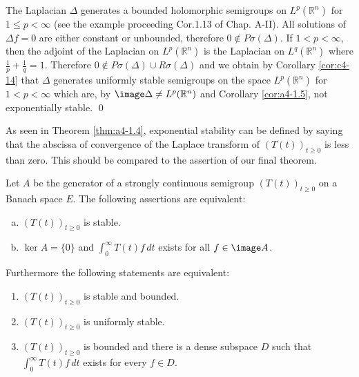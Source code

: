 \begin{example}\label{ex:a4-15}
The Laplacian $\Delta$ generates a bounded holomorphic semigroups on $L^{p}(\mathbb{R}^{n})$ for $1 \leq p < \infty$ (see the example proceeding
Cor.1.13 of Chap. A-II). 
All solutions of $\Delta f = 0$ are either constant
or unbounded, therefore $0 \not\in P\sigma(\Delta)$. 
If $1 < p < \infty$, then the adjoint
of the Laplacian on $L^{p}(\mathbb{R}^{n})$ is the Laplacian on $L^{q}(\mathbb{R}^{n})$ where
$\frac{1}{p} + \frac{1}{q} = 1$. 
Therefore $0 \not\in P\sigma(\Delta) \cup R\sigma(\Delta)$ and we obtain by Corollary \ref{cor:c4-14}
that $\Delta$ generates uniformly stable semigroups on the space $L^{p}(\mathbb{R}^{n})$
for $1 < p < \infty$ which are, by $\image \Delta \not= L^{p}(\mathbb{R}^{n})$ and Corollary \ref{cor:a4-1.5}, not exponentially stable. \qed
\end{example}
\noindent
As seen in Theorem \ref{thm:a4-1.4}, exponential stability can be defined by saying that the abscissa of convergence of the Laplace transform of $(T(t))_{t \geq 0}$ is less than zero. 
This should be compared to the assertion of our final theorem.

\begin{theorem}\label{thm:a4-1.16}
Let $A$ be the generator of a strongly continuous semigroup $(T(t))_{t \geq 0}$ on a Banach space $E$. 
The following assertions are equivalent:
\begin{enumerate}[(a)]
\item $(T(t))_{t \geq 0}$ is stable.
\item $\ker A = \{0\}$ and $\int_{0}^{\infty} T(t)f \, dt$ exists for all $f \in \image A$.
\end{enumerate}
Furthermore the following statements are equivalent:
\begin{enumerate}[(a$'$)]
\item $(T(t))_{t \geq 0}$ is stable and bounded.
\item $(T(t))_{t \geq 0}$ is uniformly stable.
\item $(T(t))_{t \geq 0}$ is bounded and there is a dense subspace $D$ such that $\int_{0}^{\infty} T(t)f \, dt$ exists for every $f \in D$.
\end{enumerate}
\end{theorem}

